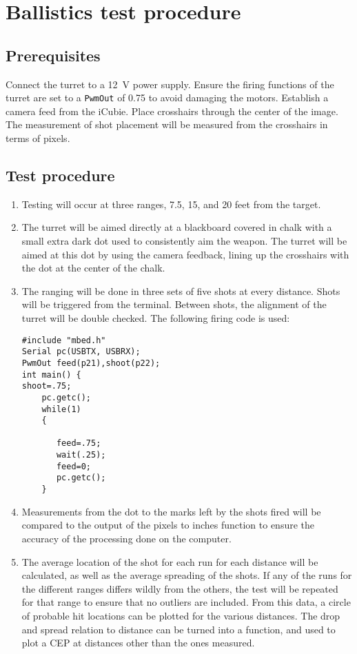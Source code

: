 ﻿\section{Ballistics test procedure}
\label{app:A}

\subsection{Prerequisites}
Connect the turret to a \SI{12}{\volt} power supply. Ensure the firing functions of the turret are set to a \lstinline{PwmOut} of 0.75 to avoid damaging the motors. Establish a camera feed from the iCubie. Place crosshairs through the center of the image. The measurement of shot placement will be measured from the crosshairs in terms of pixels.

\subsection{Test procedure}
\begin{enumerate}
\item Testing will occur at three ranges, 7.5, 15, and 20 feet from the target. 

\item The turret will be aimed directly at a blackboard covered in chalk with a small extra dark dot used to consistently aim the weapon. The turret will be aimed at this dot by using the camera feedback, lining up the crosshairs with the dot at the center of the chalk.

\item The ranging will be done in three sets of five shots at every distance. Shots will be triggered from the terminal. Between shots, the alignment of the turret will be double checked. The following firing code is used:
\begin{lstlisting}
#include "mbed.h"
Serial pc(USBTX, USBRX);
PwmOut feed(p21),shoot(p22);
int main() {
shoot=.75;
    pc.getc();
    while(1) 
    {
       
       feed=.75;
       wait(.25);
       feed=0;
       pc.getc();
    }
\end{lstlisting}

\item Measurements from the dot to the marks left by the shots fired will be compared to the output of the pixels to inches function to ensure the accuracy of the processing done on the computer. 

\item The average location of the shot for each run for each distance will be calculated, as well as the average spreading of the shots. If any of the runs for the different ranges differs wildly from the others, the test will be repeated for that range to ensure that no outliers are included. From this data, a circle of probable hit locations can be plotted for the various distances. The drop and spread relation to distance can be turned into a function, and used to plot a CEP at distances other than the ones measured.
\end{enumerate}
